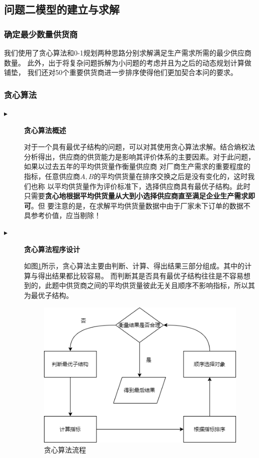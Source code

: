 \documentclass[withoutpreface,bwprint]{cumcmthesis}
\begin{document}
\subsection{问题二模型的建立与求解}
\subsubsection{确定最少数量供货商}
我们使用了贪心算法和0-1规划两种思路分别求解满足生产需求所需的最少供应商数量。
此外，出于将复杂问题拆解为小问题的考虑并且为之后的动态规划计算做铺垫，
我们还对50个重要供货商进一步排序使得他们更加契合本问的要求。
\subsubsection*{贪心算法}
\begin{description}
    \item[$\blacktriangleright$] \textbf{贪心算法概述}\par
        对于一个具有最优子结构的问题，可以对其使用贪心算法求解。结合熵权法分析得出，供应商的供货能力是影响其评价体系的主要因素。对于此问题，如果以过去五年的平均供货量作衡量供应商
        对厂商生产需求的重要程度的指标，任意供应商$A,B$的平均供货量在排序交换之后是没有变化的，这时我们也称
        以平均供货量作为评价标准下，选择供应商具有最优子结构。此时只需要\textbf{贪心地根据平均供货量从大到小选择供应商直至满足企业生产需求即可}。但
        要注意的是，在求解平均供货量数据中由于厂家未下订单的数据不具参考价值，应当剔除！
    \item[$\blacktriangleright$] \textbf{贪心算法程序设计}\par
        如图\ref{fig:4}所示，贪心算法主要由判断、计算、得出结果三部分组成。其中的计算与得出结果都比较容易。
        而判断其是否具有最优子结构往往是不容易想到的，此题中供货商之间的平均供货量彼此无关且顺序不影响指标，所以其为最优子结构。
        \begin{figure}[H]
            \centering
            \includegraphics[scale = 0.6]{TX.png}
            \centering
            \caption{贪心算法流程} \label{fig:4}
        \end{figure}
\end{description}
\end{document}
